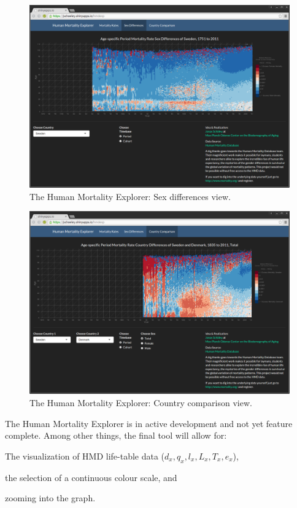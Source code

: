 \documentclass[
  12pt
]{scrartcl}
\begin{document}
\begin{figure}[ht!]
  \includegraphics[width = \linewidth]{./fig/hmd_screen_mx_sex_diff.png}
  \caption{The Human Mortality Explorer: Sex differences view.}
\end{figure}

\begin{figure}[ht!]
  \includegraphics[width = \linewidth]{./fig/hmd_screen_mx_cntry_diff.png}
  \caption{The Human Mortality Explorer: Country comparison view.}
\end{figure}

The Human Mortality Explorer is in active development and not yet feature complete. Among other things, the final tool will allow for:

\begin{compactenum}
  \item The visualization of HMD life-table data ($d_x, q_x, l_x, L_x, T_x, e_x$),
  \item the selection of a continuous colour scale, and
  \item zooming into the graph.
\end{compactenum}
\end{document}
